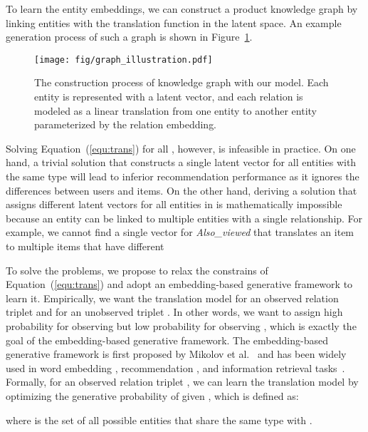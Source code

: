 \documentclass[algorithms,article,accept,moreauthors,pdftex,10pt,a4paper]{Definitions/mdpi}
\begin{document}
To learn the entity embeddings, we can construct a product knowledge graph by linking entities with the translation function in the latent space.
An example generation process of such a graph is shown in Figure~\ref{fig:illustration}.
\begin{figure}[H]
	\centering
	\vspace{-5pt}
	\texttt{[image: fig/graph\_illustration.pdf]}
	\caption{The construction process of knowledge graph with our model. Each entity is represented with a latent vector, and each relation is modeled as a linear translation from one entity to another entity parameterized by the relation embedding.}\vspace{-5pt}
	\label{fig:illustration}
\end{figure}

Solving Equation~(\ref{equ:trans}) for all , however, is infeasible in practice.
On one hand, a trivial solution that constructs a single latent vector for all entities with the same type will lead to inferior recommendation performance as it ignores the differences between users and items.
On the other hand, deriving a solution that assigns different latent vectors for all entities in  is mathematically impossible because an entity can be linked to multiple entities with a single relationship.
For example, we cannot find a single vector for \textit{Also\_viewed} that translates an item to multiple items that have different 

To solve the problems, we propose to relax the constrains of Equation~(\ref{equ:trans}) and adopt an embedding-based generative framework to learn it.
Empirically, we want the translation model  for an observed relation triplet  and  for an unobserved triplet .
In other words, we want  to assign high probability for observing  but low probability for observing , which is exactly the goal of the embedding-based generative framework. 
The embedding-based generative framework is first proposed by Mikolov et al.~\cite{mikolov2013distributed} and has been widely used in word embedding \cite{mikolov2013distributed,le2014distributed}, recommendation \cite{zhang2017joint,zheng2017joint}, and information retrieval tasks~\cite{ai2016analysis, ai2017learning}.
Formally, for an observed relation triplet , we can learn the translation model  by optimizing the generative probability of  given , which is defined as:

where  is the set of all possible entities that share the same type with .
\end{document}
